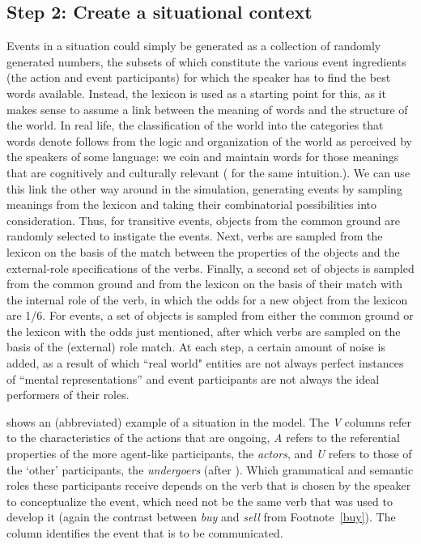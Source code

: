 \documentclass[output=paper]{LSP/langsci}
\begin{document}
\subsection{Step 2: Create a situational context}\label{17-le-sec:Situational}
Events in a situation could simply be generated as a collection of randomly generated numbers, the subsets of which constitute the various event ingredients (\ie the action and event participants) for which the speaker has to find the best words available. Instead, the lexicon is used as a starting point for this, as it makes sense to assume a link between the meaning of words and the structure of the world. In real life, the classification of the world into the categories that words denote follows from the logic and organization of the world as perceived by the speakers of some language: we coin and maintain words for those meanings that are cognitively and culturally relevant (\cf \eg \citealt{Jackendoff2012Users} for the same intuition.). We can use this link the other way around in the simulation, generating events by sampling meanings from the lexicon and taking their combinatorial possibilities into consideration. Thus, for transitive events, objects from the common ground are randomly selected to instigate the events. Next, verbs are sampled from the lexicon on the basis of the match between the properties of the objects and the external-role specifications of the verbs. Finally, a second set of objects is sampled from the common ground and from the lexicon on the basis of their match with the internal role of the verb, in which the odds for a new object from the lexicon are 1/6. For  events, a set of objects is sampled from either the common ground or the lexicon with the odds just mentioned, after which verbs are sampled on the basis of the (external) role match. At each step, a certain amount of noise is added, as a result of which ``real world" entities are not always perfect instances of ``mental representations'' and event participants are not always the ideal performers of their roles.

 shows an (abbreviated) example of a situation in the model. The \textit{V} columns refer to the characteristics of the actions that are ongoing, \textit{A} refers to the referential properties of the more agent-like participants, the \textit{actors}, and \textit{U} refers to those of the `other' participants, the \textit{undergoers} (after \citealt{VanValin1999Generalized}). Which grammatical and semantic roles these participants receive depends on the verb that is chosen by the speaker to conceptualize the event, which need not be the same verb that was used to develop it (\cf again the contrast between \textit{buy} and \textit{sell} from Footnote~\ref{buy}). The  column identifies the event that is to be communicated. 
\end{document}
